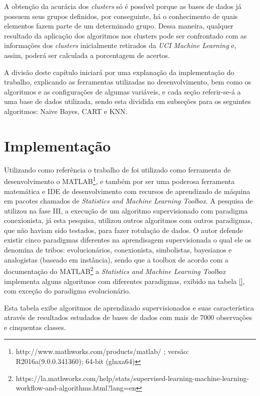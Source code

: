 A obtenção da acurácia dos \textit{clusters} só é possível porque as bases de dados já possuem seus grupos definidos, por conseguinte, há o conhecimento de quais elementos fazem parte de um determinado grupo. Dessa maneira, qualquer resultado da aplicação dos algoritmos nos clusters pode ser confrontado com as informações dos \textit{clusters} inicialmente retirados da \textit{UCI Machine Learning} e, assim, poderá ser calculada a porcentagem de acertos.


A divisão deste capítulo iniciará por uma explanação da implementação do trabalho, explicando as ferramentas utilizadas no desenvolvimento, bem como os algoritmos e  as configurações de algumas variáveis, e cada seção referir-se-á a uma base de dados utilizada, sendo esta dividida em subseções para os seguintes algoritmos: Naive Bayes, CART e KNN. 

\section{Implementação}\label{cap:resultados:sec:implement}


Utilizando como referência o  trabalho de  \cite{Lopes2016} foi utilizado como ferramenta de desenvolvimento o MATLAB\footnote{http://www.mathworks.com/products/matlab/ ; versão: R2016a(9.0.0.341360); 64-bit (glnxa64)}, e também por ser uma poderosa ferramenta matemática e IDE de desenvolvimento com recursos de aprendizado de máquina em pacotes chamados de \textit{Statistics and Machine Learning Toolbox}. A pesquisa de  utilizou na fase III, a execução de um algoritmo supervisionado com paradigma conexionista, já  esta pesquisa, utilizou outros algoritmos com outros paradigmas, que não haviam sido testados,  para fazer rotulação de dados.  O autor \cite{pedro2017} defende existir cinco paradigmas diferentes na aprendisagem supervisionada o qual ele os denomina de tribos: evolucionários, conexionista, simbolistas, bayesianos e analogistas (baseado em instância), sendo que a toolbox de acordo com a documentação do MATLAB\footnote{https://la.mathworks.com/help/stats/supervised-learning-machine-learning-workflow-and-algorithms.html?lang=en} a \textit{Statistics and Machine Learning Toolbox} implementa alguns algoritmos com diferentes paradigmas, exibido na tabela \ref{}, com exceção do paradigma evolucionário.

Esta tabela exibe algoritmos de aprendizado  supervisionados e suas característica através de resultados  estudados de bases de dados com mais de 7000 observações e cinquentas classes.



